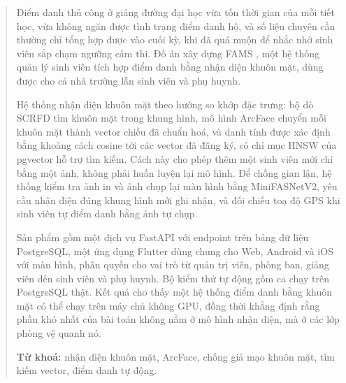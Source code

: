 \begin{abstract}

Điểm danh thủ công ở giảng đường đại học vừa tốn thời gian của mỗi tiết
học, vừa không ngăn được tình trạng điểm danh hộ, và số liệu chuyên cần
thường chỉ tổng hợp được vào cuối kỳ, khi đã quá muộn để nhắc nhở sinh viên
sắp chạm ngưỡng cấm thi. Đồ án xây dựng FAMS , một hệ thống quản lý sinh viên tích hợp điểm danh bằng nhận diện
khuôn mặt, dùng được cho cả nhà trường lẫn sinh viên và phụ huynh.

Hệ thống nhận diện khuôn mặt theo hướng so khớp đặc trưng: bộ dò SCRFD tìm
khuôn mặt trong khung hình, mô hình ArcFace chuyển mỗi khuôn mặt thành vector
\FchieuVector{} chiều đã chuẩn hoá, và danh tính được xác định bằng khoảng
cách cosine tới các vector đã đăng ký, có chỉ mục HNSW của pgvector hỗ trợ
tìm kiếm. Cách này cho phép thêm một sinh viên mới chỉ bằng một ảnh, không
phải huấn luyện lại mô hình. Để chống gian lận, hệ thống kiểm tra ảnh in và
ảnh chụp lại màn hình bằng MiniFASNetV2, yêu cầu nhận diện đúng
\FsoKhungXacNhan{} khung hình mới ghi nhận, và đối chiếu toạ độ GPS khi sinh
viên tự điểm danh bằng ảnh tự chụp.

Sản phẩm gồm một dịch vụ FastAPI với \FsoEndpoint{} endpoint trên
\FsoBang{} bảng dữ liệu PostgreSQL, một ứng dụng Flutter dùng chung cho Web,
Android và iOS với \FsoManHinh{} màn hình, phân quyền cho \FsoVaiTro{} vai
trò từ quản trị viên, phòng ban, giảng viên đến sinh viên và phụ huynh. Bộ
kiểm thử tự động gồm \FsoTest{} ca chạy trên PostgreSQL thật. Kết quả cho
thấy một hệ thống điểm danh bằng khuôn mặt có thể chạy trên máy chủ không
GPU, đồng thời khẳng định rằng phần khó nhất của bài toán không nằm ở mô
hình nhận diện, mà ở các lớp phòng vệ quanh nó.

\vspace{0.8em}
\noindent\textbf{Từ khoá:} nhận diện khuôn mặt, ArcFace, chống giả mạo
khuôn mặt, tìm kiếm vector, điểm danh tự động.

\end{abstract}
